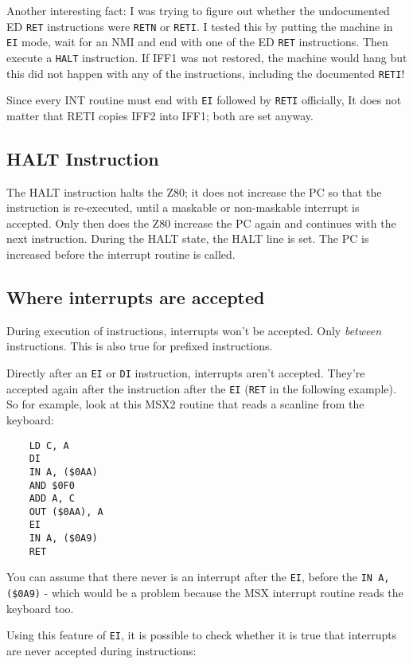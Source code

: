 Another interesting fact: I was trying to figure out whether the undocumented ED {\tt RET} instructions were {\tt RETN} or {\tt RETI}. I tested this by putting the machine in {\tt EI} mode, wait for an NMI and end with one of the ED {\tt RET} instructions. Then execute a {\tt HALT} instruction. If IFF1 was not restored, the machine would hang but this did not happen with any of the instructions, including the documented {\tt RETI}!

Since every INT routine must end with {\tt EI} followed by {\tt RETI} officially, It does not matter that RETI copies IFF2 into IFF1; both are set anyway.


\subsection{HALT Instruction}

The HALT instruction halts the Z80; it does not increase the PC so that the instruction is re-executed, until a maskable or non-maskable interrupt is accepted. Only then does the Z80 increase the PC again and continues with the next instruction. During the HALT state, the HALT line is set. The PC is increased before the interrupt routine is called.


\subsection{Where interrupts are accepted}

During execution of instructions, interrupts won't be accepted. Only {\em between} instructions. This is also true for prefixed instructions.

Directly after an {\tt EI} or {\tt DI} instruction, interrupts aren't accepted. They're accepted again after the instruction after the {\tt EI} ({\tt RET} in the following example). So for example, look at this MSX2 routine that reads a scanline from the keyboard:

\begin{lstlisting}
    LD C, A
    DI
    IN A, ($0AA)
    AND $0F0
    ADD A, C
    OUT ($0AA), A
    EI
    IN A, ($0A9)
    RET
\end{lstlisting}

You can assume that there never is an interrupt after the {\tt EI}, before the {\tt IN A,(\$0A9)} - which would be a problem because the MSX interrupt routine reads the keyboard too.

\pagebreak
Using this feature of {\tt EI}, it is possible to check whether it is true that interrupts are never accepted during instructions:

